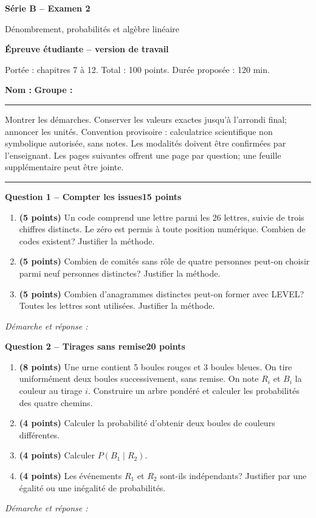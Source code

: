 \documentclass[11pt,a4paper]{article}
\begin{document}
{\LARGE\bfseries Série B -- Examen 2}\par
{\large Dénombrement, probabilités et algèbre linéaire}\par
\textbf{Épreuve étudiante -- version de travail}\par
Portée : chapitres 7 à 12. Total : 100 points. Durée proposée : 120 min.\par
\textbf{Nom :} \hrulefill\quad \textbf{Groupe :} \rule{22mm}{0.3pt}\par
\small Montrer les démarches. Conserver les valeurs exactes jusqu’à l’arrondi final; annoncer les unités. Convention provisoire : calculatrice scientifique non symbolique autorisée, sans notes. Les modalités doivent être confirmées par l’enseignant. Les pages suivantes offrent une page par question; une feuille supplémentaire peut être jointe.\normalsize\par
\vspace{3mm}\hrule\vspace{4mm}
{\large\bfseries Question 1 -- Compter les issues}\hfill\textbf{15 points}\par
\begin{enumerate}
\item \textbf{(5 points)} Un code comprend une lettre parmi les 26 lettres, suivie de trois chiffres distincts. Le zéro est permis à toute position numérique. Combien de codes existent? Justifier la méthode.
\item \textbf{(5 points)} Combien de comités sans rôle de quatre personnes peut-on choisir parmi neuf personnes distinctes? Justifier la méthode.
\item \textbf{(5 points)} Combien d’anagrammes distinctes peut-on former avec LEVEL? Toutes les lettres sont utilisées. Justifier la méthode.
\end{enumerate}
\vspace{3mm}\textit{Démarche et réponse :}\par\vfill

\newpage
{\large\bfseries Question 2 -- Tirages sans remise}\hfill\textbf{20 points}\par
\begin{enumerate}
\item \textbf{(8 points)} Une urne contient 5 boules rouges et 3 boules bleues. On tire uniformément deux boules successivement, sans remise. On note \(R_i\) et \(B_i\) la couleur au tirage \(i\). Construire un arbre pondéré et calculer les probabilités des quatre chemins.
\item \textbf{(4 points)} Calculer la probabilité d’obtenir deux boules de couleurs différentes.
\item \textbf{(4 points)} Calculer \(P(B_1\mid R_2)\).
\item \textbf{(4 points)} Les événements \(R_1\) et \(R_2\) sont-ils indépendants? Justifier par une égalité ou une inégalité de probabilités.
\end{enumerate}
\vspace{3mm}\textit{Démarche et réponse :}\par\vfill
\end{document}
